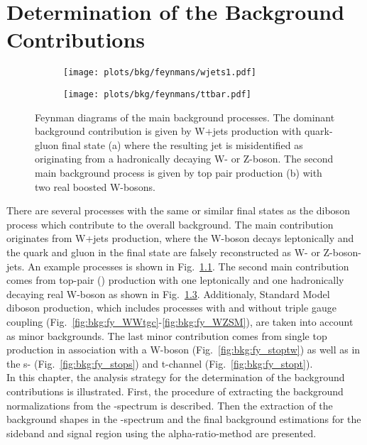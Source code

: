 \chapter{Determination of the Background Contributions}
\label{chap:DeterminationoftheBackgroundContributions}
\begin{figure}[H!b]
	\centering
	\begin{subfigure}{0.4\textwidth}
		\texttt{[image: plots/bkg/feynmans/wjets1.pdf]}
		\caption{}
		\label{fig:bkg:fy_wjets1}
	\end{subfigure}
	\begin{subfigure}{0.4\textwidth}
		\texttt{[image: plots/bkg/feynmans/ttbar.pdf]}
		\caption{}
		\label{fig:bkg:fy_ttbar}
	\end{subfigure}
	\caption[Feynman diagrams of the main background processes.]{Feynman diagrams of the main background processes. The dominant background contribution is given by W+jets production with quark-gluon final state (a) where the resulting jet is misidentified as originating from a hadronically decaying W- or Z-boson. The second main background process is given by top pair production (b) with two real boosted W-bosons.}
\end{figure}
There are several processes with the same or similar final states as the diboson process which contribute to the overall background. The main contribution originates from W+jets production, where the W-boson decays leptonically and the quark and gluon in the final state are falsely reconstructed as W- or Z-boson-jets. An example processes is shown in Fig.~\ref{fig:bkg:fy_wjets1}. The second main contribution comes from top-pair (\ttbar) production with one leptonically and one hadronically decaying real W-boson as shown in Fig.~\ref{fig:bkg:fy_ttbar}. Additionaly, Standard Model diboson production, which includes processes with and without triple gauge coupling (Fig.~\ref{fig:bkg:fy_WWtgc}-\ref{fig:bkg:fy_WZSM}), are taken into account as minor backgrounds. The last minor contribution comes from single top production in association with a W-boson (Fig.~\ref{fig:bkg:fy_stoptw}) as well as in the s- (Fig.~\ref{fig:bkg:fy_stops}) and t-channel (Fig.~\ref{fig:bkg:fy_stopt}).\\
In this chapter, the analysis strategy for the determination of the background contributions is illustrated. First, the procedure of extracting the background normalizations from the \Mpr -spectrum is described. Then the extraction of the background shapes in the \MWV -spectrum and the final background estimations for the sideband and signal region using the alpha-ratio-method are presented.


